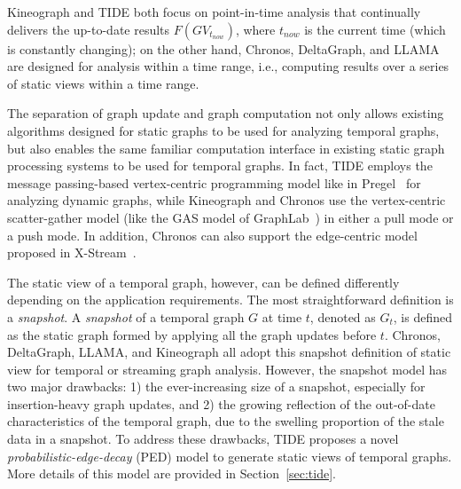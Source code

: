 \documentclass{svjour3}
\begin{document}
Kineograph and TIDE both focus on point-in-time analysis that continually delivers the up-to-date results $F(GV_{t_{now}})$, where $t_{now}$ is the current time (which is constantly changing); on the other hand, Chronos, DeltaGraph, and LLAMA are designed for analysis within a time range, i.e., computing results over a series of static views within a time range.

The separation of graph update and graph computation not only allows existing algorithms designed for static graphs to be used for analyzing temporal graphs, but also enables the same familiar computation interface in existing static graph processing systems to be used for temporal graphs. In fact, TIDE employs the message passing-based vertex-centric programming model like in Pregel~\cite{pregel} for analyzing dynamic graphs, while Kineograph and Chronos use the vertex-centric scatter-gather model (like the GAS model of GraphLab~\cite{graphlab}) in either a pull mode or a push mode. In addition, Chronos can also support the edge-centric model proposed in X-Stream~\cite{xstream}.

\vspace{2mm}

 The static view of a temporal graph, however, can be defined differently depending on the application requirements. The most straightforward definition is a \emph{snapshot}. A \emph{snapshot} of a temporal graph $G$ at time $t$, denoted as $G_t$, is defined as the static graph formed by applying all the graph updates before $t$. Chronos, DeltaGraph, LLAMA, and Kineograph all adopt this snapshot definition of static view for temporal or streaming graph analysis. However, the snapshot model has two major drawbacks: 1) the ever-increasing size of a snapshot, especially for insertion-heavy graph updates, and 2) the growing reflection of the out-of-date characteristics of the temporal graph, due to the swelling proportion of the stale data in a snapshot. To address these drawbacks, TIDE proposes a novel \emph{probabilistic-edge-decay} (PED) model to generate static views of temporal graphs. More details of this model are provided in Section~\ref{sec:tide}.

\vspace{2mm}
\end{document}
